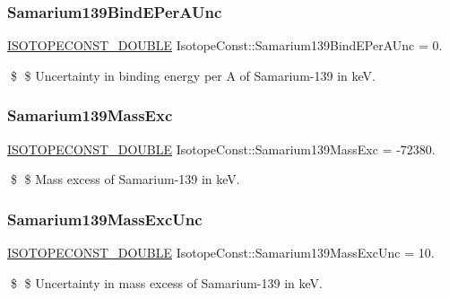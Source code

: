 \subsubsection{\texorpdfstring{Samarium139\+Bind\+E\+Per\+A\+Unc}{Samarium139BindEPerAUnc}}
{\footnotesize\ttfamily \mbox{\hyperlink{group___isotope_const-_macros_ga8f45a7272ce02c0b4c65c44636ed719a}{I\+S\+O\+T\+O\+P\+E\+C\+O\+N\+S\+T\+\_\+\+D\+O\+U\+B\+LE}} Isotope\+Const\+::\+Samarium139\+Bind\+E\+Per\+A\+Unc = 0.}

\$ \$ Uncertainty in binding energy per A of Samarium-\/139 in keV. \mbox{\label{group___isotope_const-_samarium-_sm139_gabee4b018dfda8b0a4a524c06b18a18ab}} 
\subsubsection{\texorpdfstring{Samarium139\+Mass\+Exc}{Samarium139MassExc}}
{\footnotesize\ttfamily \mbox{\hyperlink{group___isotope_const-_macros_ga8f45a7272ce02c0b4c65c44636ed719a}{I\+S\+O\+T\+O\+P\+E\+C\+O\+N\+S\+T\+\_\+\+D\+O\+U\+B\+LE}} Isotope\+Const\+::\+Samarium139\+Mass\+Exc = -\/72380.}

\$ \$ Mass excess of Samarium-\/139 in keV. \mbox{\label{group___isotope_const-_samarium-_sm139_ga2f186689681c9220be45315edbf5f3ba}} 
\subsubsection{\texorpdfstring{Samarium139\+Mass\+Exc\+Unc}{Samarium139MassExcUnc}}
{\footnotesize\ttfamily \mbox{\hyperlink{group___isotope_const-_macros_ga8f45a7272ce02c0b4c65c44636ed719a}{I\+S\+O\+T\+O\+P\+E\+C\+O\+N\+S\+T\+\_\+\+D\+O\+U\+B\+LE}} Isotope\+Const\+::\+Samarium139\+Mass\+Exc\+Unc = 10.}

\$ \$ Uncertainty in mass excess of Samarium-\/139 in keV. \mbox{\label{group___isotope_const-_samarium-_sm139_ga4d2e2a5406d1f5830327fa0d294f64d5}} 
